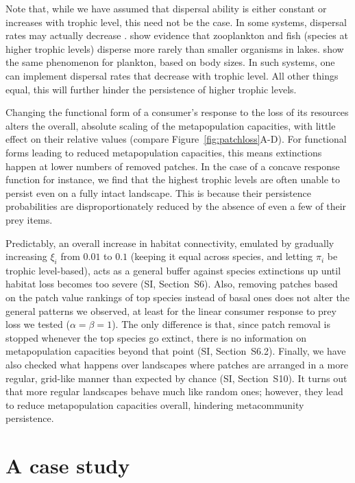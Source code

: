 \documentclass[11pt]{article}
\newcommand{\SI}{SI}
\begin{document}
Note that, while we have assumed that dispersal ability is either constant or increases with trophic level, this need not be the case. In some systems, dispersal rates may actually decrease \citep{Pedersenetal2016}. \citet{Beisneretal2006} show evidence that zooplankton and fish (species at higher trophic levels) disperse more rarely than smaller organisms in lakes. \citet{Villarinoetal2018} show the same phenomenon for plankton, based on body sizes. In such systems, one can implement dispersal rates that decrease with trophic level. All other things equal, this will further hinder the persistence of higher trophic levels.

Changing the functional form of a consumer's response to the loss of its resources alters the overall, absolute scaling of the metapopulation capacities, with little effect on their relative values (compare Figure~\ref{fig:patchloss}A-D). For functional forms leading to reduced metapopulation capacities, this means extinctions happen at lower numbers of removed patches. In the case of a concave response function for instance, we find that the highest trophic levels are often unable to persist even on a fully intact landscape. This is because their persistence probabilities are disproportionately reduced by the absence of even a few of their prey items.

Predictably, an overall increase in habitat connectivity, emulated by gradually increasing $\xi_i$ from $0.01$ to $0.1$ (keeping it equal across species, and letting $\pi_i$ be trophic level-based), acts as a general buffer against species extinctions up until habitat loss becomes too severe (\SI, Section~S6). Also, removing patches based on the patch value rankings of top species instead of basal ones does not alter the general patterns we observed, at least for the linear consumer response to prey loss we tested ($\alpha = \beta = 1$). The only difference is that, since patch removal is stopped whenever the top species go extinct, there is no information on metapopulation capacities beyond that point (\SI, Section~S6.2). Finally, we have also checked what happens over landscapes where patches are arranged in a more regular, grid-like manner than expected by chance (\SI, Section~S10). It turns out that more regular landscapes behave much like random ones; however, they lead to reduce metapopulation capacities overall, hindering metacommunity persistence.


\section{A case study} \label{sec:empirical}
\end{document}
